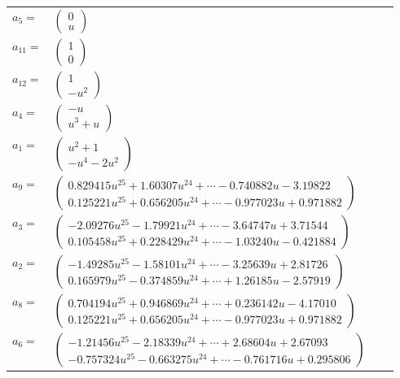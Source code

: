 \documentclass[1p]{elsarticle_modified}
\theoremstyle{definition}
\begin{document}
\begin{tabular}{m{7pt} m{180pt} m{7pt} m{180pt} }
\flushright $a_{5}=$&$\begin{pmatrix}0\\u\end{pmatrix}$ \\
\flushright $a_{11}=$&$\begin{pmatrix}1\\0\end{pmatrix}$ \\
\flushright $a_{12}=$&$\begin{pmatrix}1\\- u^2\end{pmatrix}$ \\
\flushright $a_{4}=$&$\begin{pmatrix}- u\\u^3+u\end{pmatrix}$ \\
\flushright $a_{1}=$&$\begin{pmatrix}u^2+1\\- u^4-2 u^2\end{pmatrix}$ \\
\flushright $a_{9}=$&$\begin{pmatrix}0.829415 u^{25}+1.60307 u^{24}+\cdots-0.740882 u-3.19822\\0.125221 u^{25}+0.656205 u^{24}+\cdots-0.977023 u+0.971882\end{pmatrix}$ \\
\flushright $a_{3}=$&$\begin{pmatrix}-2.09276 u^{25}-1.79921 u^{24}+\cdots-3.64747 u+3.71544\\0.105458 u^{25}+0.228429 u^{24}+\cdots-1.03240 u-0.421884\end{pmatrix}$ \\
\flushright $a_{2}=$&$\begin{pmatrix}-1.49285 u^{25}-1.58101 u^{24}+\cdots-3.25639 u+2.81726\\0.165979 u^{25}-0.374859 u^{24}+\cdots+1.26185 u-2.57919\end{pmatrix}$ \\
\flushright $a_{8}=$&$\begin{pmatrix}0.704194 u^{25}+0.946869 u^{24}+\cdots+0.236142 u-4.17010\\0.125221 u^{25}+0.656205 u^{24}+\cdots-0.977023 u+0.971882\end{pmatrix}$ \\
\flushright $a_{6}=$&$\begin{pmatrix}-1.21456 u^{25}-2.18339 u^{24}+\cdots+2.68604 u+2.67093\\-0.757324 u^{25}-0.663275 u^{24}+\cdots-0.761716 u+0.295806\end{pmatrix}$ \\

\end{tabular}
\end{document}
